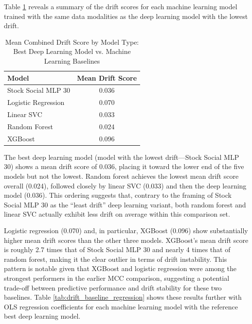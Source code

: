 \documentclass[stu,floatsintext]{apa7}
\begin{document}
Table \ref{tab:drift_descriptives} reveals a summary of the drift scores for each machine learning model trained with the same data modalities as the deep learning model with the lowest drift.
\medskip
\medskip

\begin{table}[htbp]
\centering
\caption{Mean Combined Drift Score by Model Type: Best Deep Learning Model vs. Machine Learning Baselines}
\label{tab:drift_descriptives}
\begin{tabular}{lc}
\toprule
Model & Mean Drift Score \\
\midrule
Stock Social MLP 30         & 0.036 \\
Logistic Regression    & 0.070 \\
Linear SVC             & 0.033 \\
Random Forest           & 0.024 \\
XGBoost                 & 0.096 \\
\bottomrule
\end{tabular}
\end{table}

The best deep learning model (model with the lowest drift—Stock Social MLP 30) shows a mean drift score of 0.036, placing it toward the lower end of the five models but not the lowest. Random forest achieves the lowest mean drift score overall (0.024), followed closely by linear SVC (0.033) and then the deep learning model (0.036). This ordering suggests that, contrary to the framing of Stock Social MLP 30 as the ``least drift'' deep learning variant, both random forest and linear SVC actually exhibit less drift on average within this comparison set.

Logistic regression (0.070) and, in particular, XGBoost (0.096) show substantially higher mean drift scores than the other three models. XGBoost's mean drift score is roughly 2.7 times that of Stock Social MLP 30 and nearly 4 times that of random forest, making it the clear outlier in terms of drift instability. This pattern is notable given that XGBoost and logistic regression were among the strongest performers in the earlier MCC comparison, suggesting a potential trade-off between predictive performance and drift stability for these two baselines. Table \ref{tab:drift_baseline_regression} shows these results further with OLS regression coefficients for each machine learning model with the reference best deep learning model.
\medskip
\medskip
\end{document}
